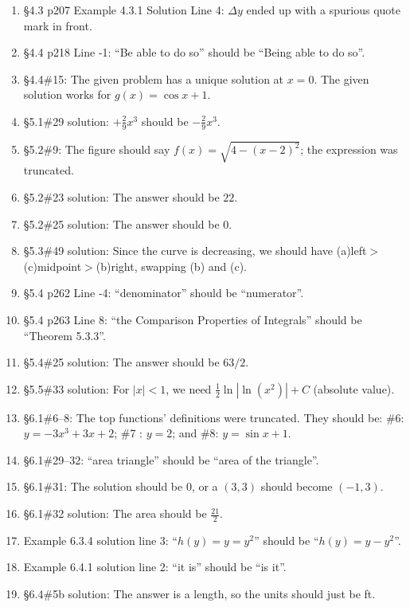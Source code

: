 \documentclass{amsart}
\newcommand{\abs}[1]{\left\lvert#1\right\rvert}
\begin{document}
\begin{enumerate}
\item \S4.3 p207 Example 4.3.1 Solution Line 4: $\Delta y$ ended up with a spurious quote mark in front.
\item \S4.4 p218 Line -1: ``Be able to do so'' should be ``Being able to do so''.
\item \S4.4\#15: The given problem has a unique solution at $x=0$.  The given solution works for $g(x)=\cos x+1$.
\item \S5.1\#29 solution: $+\frac29 x^3$ should be $-\frac29 x^3$.
\item \S5.2\#9: The figure should say $f(x)=\sqrt{4-(x-2)^2}$; the expression was truncated.
\item \S5.2\#23 solution: The answer should be $22$.
\item \S5.2\#25 solution: The answer should be $0$.
\item \S5.3\#49 solution: Since the curve is decreasing, we should have (a)left$>$(c)midpoint$>$(b)right, swapping (b) and (c).
\item \S5.4 p262 Line -4: ``denominator'' should be ``numerator''.
\item \S5.4 p263 Line 8: ``the Comparison Properties of Integrals'' should be ``Theorem 5.3.3''.
\item \S5.4\#25 solution: The answer should be $63/2$.
\item \S5.5\#33 solution: For $\abs x<1$, we need $\frac12 \ln\abs{\ln \left(x^2\right)}+C$ (absolute value).
\item \S6.1\#6--8: The top functions' definitions were truncated.  They should be: \#6: $y=-3x^3+3x+2$; \#7 : $y=2$; and \#8: $y=\sin x+1$.
\item \S6.1\#29--32: ``area triangle'' should be ``area of the triangle''.
\item \S6.1\#31: The solution should be 0, or a $(3,3)$ should become $(-1,3)$.
\item \S6.1\#32 solution: The area should be $\frac{21}2$.
\item Example 6.3.4 solution line 3: ``$h(y)=y=y^2$'' should be ``$h(y)=y-y^2$''.
\item Example 6.4.1 solution line 2: ``it is'' should be ``is it''.
\item \S6.4\#5b solution: The answer is a length, so the units should just be ft.
\label{2018-07-13I}
\end{enumerate}%

\newpage
\end{document}
